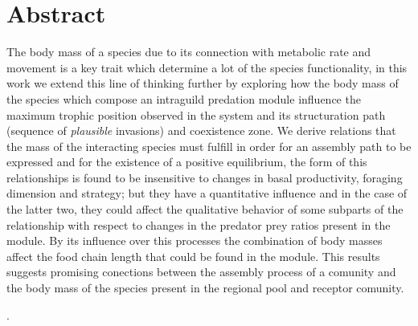 \section{Abstract}
The body mass of a species due to its connection with metabolic rate and movement is a key trait which determine a lot of the species functionality, in this work we extend this line of thinking further by exploring how the body mass of the species which compose an intraguild predation module influence the maximum trophic position observed in the system and its structuration path (sequence of \textit{plausible} invasions) and coexistence zone. We derive relations that the mass of the interacting species must fulfill in order for an assembly path to be expressed and for the existence of a positive equilibrium, the form of this relationships is found to be insensitive to changes in basal productivity, foraging dimension and strategy; but they have a quantitative influence and in the case of the latter two, they could affect the qualitative behavior of some subparts of the relationship with respect to changes in the predator prey ratios present in the module. By its influence over this processes the combination of body masses affect the food chain length that could be found in the module. This results suggests promising conections between the assembly process of a comunity and the body mass of the species present in the regional pool and receptor comunity.

.
